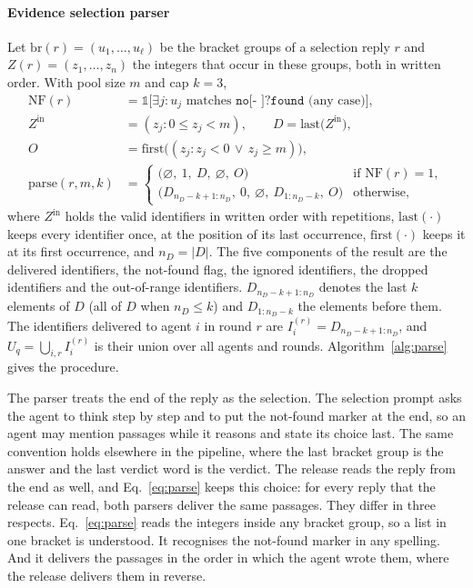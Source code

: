 \paragraph{Evidence selection parser}
Let $\mathrm{br}(r)=(u_1,\dots,u_\ell)$ be the bracket groups of a selection reply $r$ and $Z(r)=(z_1,\dots,z_n)$ the integers that occur in these groups, both in written order. With pool size $m$ and cap $k=3$,
\begin{equation}
\begin{aligned}
\mathrm{NF}(r) &= \mathbb{1}\big[\exists j: u_j \text{ matches } \texttt{no[- ]?found} \text{ (any case)}\big],\\
Z^{\mathrm{in}} &= (z_j : 0\le z_j<m), \qquad D = \mathrm{last}\big(Z^{\mathrm{in}}\big),\\
O &= \mathrm{first}\big((z_j : z_j<0 \,\vee\, z_j\ge m)\big),\\
\mathrm{parse}(r,m,k) &=
\begin{cases}
\big(\varnothing,\ 1,\ D,\ \varnothing,\ O\big) & \text{if } \mathrm{NF}(r)=1,\\
\big(D_{n_D-k+1:n_D},\ 0,\ \varnothing,\ D_{1:n_D-k},\ O\big) & \text{otherwise},
\end{cases}
\end{aligned}
\label{eq:parse}
\end{equation}
where $Z^{\mathrm{in}}$ holds the valid identifiers in written order with repetitions, $\mathrm{last}(\cdot)$ keeps every identifier once, at the position of its last occurrence, $\mathrm{first}(\cdot)$ keeps it at its first occurrence, and $n_D=|D|$. The five components of the result are the delivered identifiers, the not-found flag, the ignored identifiers, the dropped identifiers and the out-of-range identifiers. $D_{n_D-k+1:n_D}$ denotes the last $k$ elements of $D$ (all of $D$ when $n_D\le k$) and $D_{1:n_D-k}$ the elements before them. The identifiers delivered to agent $i$ in round $r$ are $I_i^{(r)} = D_{n_D-k+1:n_D}$, and $U_q=\bigcup_{i,r} I_i^{(r)}$ is their union over all agents and rounds. Algorithm~\ref{alg:parse} gives the procedure.

The parser treats the end of the reply as the selection. The selection prompt asks the agent to think step by step and to put the not-found marker at the end, so an agent may mention passages while it reasons and state its choice last. The same convention holds elsewhere in the pipeline, where the last bracket group is the answer and the last verdict word is the verdict. The release reads the reply from the end as well, and Eq.~\eqref{eq:parse} keeps this choice: for every reply that the release can read, both parsers deliver the same passages. They differ in three respects. Eq.~\eqref{eq:parse} reads the integers inside any bracket group, so a list in one bracket is understood. It recognises the not-found marker in any spelling. And it delivers the passages in the order in which the agent wrote them, where the release delivers them in reverse.

